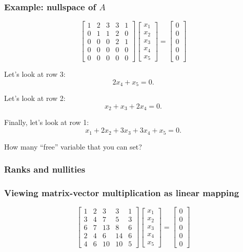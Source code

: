 \begin{frame}
  \frametitle{Example: nullspace of $A$}

  {\footnotesize
    \[
    \begin{bmatrix}
      1 & 2 & 3 & 3 & 1 \\
      0 & 1 & 1 & 2 & 0 \\
      0 & 0 & 0 & 2 & 1 \\
      0 & 0 & 0 & 0 & 0 \\
      0 & 0 & 0 & 0 & 0 
    \end{bmatrix}
    \begin{bmatrix}
      x_1 \\ x_2 \\ x_3 \\ x_4 \\ x_5
    \end{bmatrix}
    =
    \begin{bmatrix}
      0 \\ 0 \\ 0 \\ 0 \\ 0
    \end{bmatrix}
    \]
  }
  \vspace{0.2in}
  
  \pause
  Let's look at row 3:
  \[
  2x_4 + x_5 = 0.
  \]

  \pause
  Let's look at row 2:
  \[
  x_2 + x_3 + 2x_4 = 0.
  \]

  \pause
  Finally, let's look at row 1:
  \[
  x_1 + 2x_2 + 3x_3 + 3x_4 + x_5 = 0.
  \]

  \pause
  How many ``free'' variable that you can set?
  
\end{frame}

\begin{frame}
  \frametitle{Ranks and nullities}
\end{frame}

\begin{frame}
  \frametitle{Viewing matrix-vector multiplication as linear mapping}
  {\footnotesize
    \[
    \begin{bmatrix}
    1 & 2 & 3 & 3 & 1 \\
    3 & 4 & 7 & 5 & 3 \\
    6 & 7 & 13 & 8 & 6 \\
    2 & 4 & 6 & 14 & 6 \\
    4 & 6 & 10 & 10 & 5 
    \end{bmatrix}
    \begin{bmatrix}
      x_1 \\ x_2 \\ x_3 \\ x_4 \\ x_5
    \end{bmatrix}
    =
    \begin{bmatrix}
      0 \\ 0 \\ 0 \\ 0 \\ 0
    \end{bmatrix}
    \]
  }
  \vspace{2in}
\end{frame}

